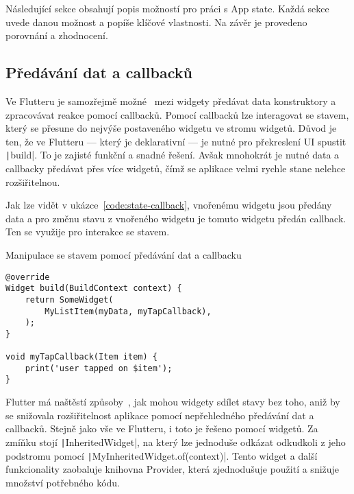Následující sekce obsahují popis možností pro práci s App state.
Každá sekce uvede danou možnost a popíše klíčové vlastnosti.
Na závěr je provedeno porovnání a zhodnocení.

\subsection{Předávání dat a callbacků}
\label{sec:data-callback-transfer}

Ve Flutteru je samozřejmě možné~\cite{flutter_state_mgmt_simple} mezi widgety
předávat data konstruktory
a zpracovávat reakce pomocí callbacků. 
Pomocí callbacků lze interagovat se stavem,
který se přesune do nejvýše postaveného widgetu ve stromu widgetů.
Důvod je ten,
že ve Flutteru
--- který je deklarativní ---
je nutné pro překreslení UI spustit \texttt|build|.
To je zajisté funkční a snadné řešení.
Avšak mnohokrát je nutné data a callbacky předávat přes více widgetů,
čímž se aplikace velmi rychle stane nelehce rozšiřitelnou.

Jak lze vidět v ukázce~\ref{code:state-callback},
vnořenému widgetu jsou předány data
a pro změnu stavu z vnořeného widgetu je tomuto widgetu předán callback.
Ten se využije pro interakce se stavem.

\begin{listing}
    \caption{Manipulace se stavem pomocí předávání dat a callbacku
\cite{flutter_state_mgmt_simple}}
    \label{code:state-callback}
    \begin{verbatim}
@override
Widget build(BuildContext context) {
    return SomeWidget(
        MyListItem(myData, myTapCallback),
    );
}

void myTapCallback(Item item) {
    print('user tapped on $item');
}
    \end{verbatim}
\end{listing}

Flutter má naštěstí způsoby~\cite{flutter_state_mgmt_simple},
jak mohou widgety sdílet stavy bez toho,
aniž by se snižovala rozšiřitelnost aplikace pomocí nepřehledného předávání
dat a callbacků.
Stejně jako vše ve Flutteru,
i toto je řešeno pomocí widgetů.
Za zmíňku stojí \texttt|InheritedWidget|,
na který lze jednoduše odkázat odkudkoli z jeho podstromu pomocí
\texttt|MyInheritedWidget.of(context)|.
Tento widget a další funkcionality zaobaluje knihovna Provider,
která zjednodušuje použití a snižuje množství potřebného kódu.

